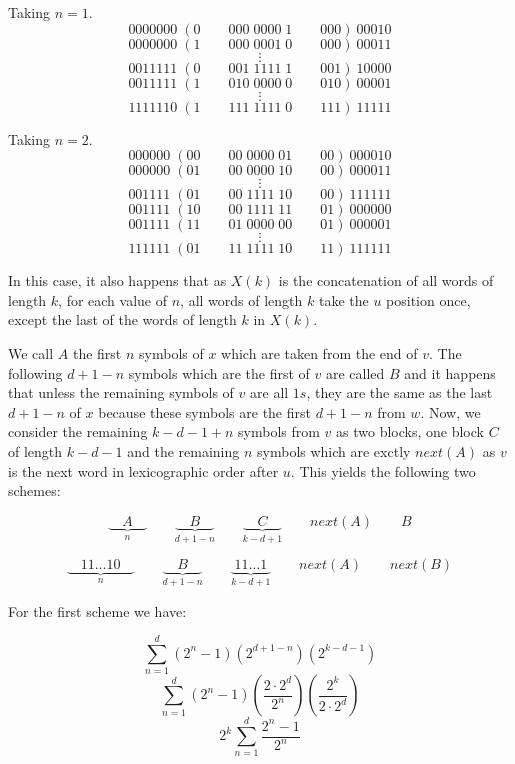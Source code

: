 \documentclass[11pt,a4paper]{tesis}
\begin{document}
Taking $n = 1$.
$$0000000\; (0 \qquad 000 \; 0000 \; 1 \qquad 000) \: 00010$$
$$0000000\; (1 \qquad 000 \; 0001 \; 0 \qquad 000) \: 00011$$
$$\vdots$$
$$0011111\; (0 \qquad 001 \; 1111 \; 1 \qquad 001) \: 10000$$
$$0011111\; (1 \qquad 010 \; 0000 \; 0 \qquad 010) \: 00001$$
$$\vdots$$
$$1111110\; (1 \qquad 111 \; 1111 \; 0 \qquad 111) \: 11111$$

Taking $n = 2$.
$$000000\; (00 \qquad 00 \; 0000 \; 01 \qquad 00) \: 000010$$
$$000000\; (01 \qquad 00 \; 0000 \; 10 \qquad 00) \: 000011$$
$$\vdots$$
$$001111\; (01 \qquad 00 \; 1111 \; 10 \qquad 00) \: 111111$$
$$001111\; (10 \qquad 00 \; 1111 \; 11 \qquad 01) \: 000000$$
$$001111\; (11 \qquad 01 \; 0000 \; 00 \qquad 01) \: 000001$$
$$\vdots$$
$$111111\; (01 \qquad 11 \; 1111 \; 10 \qquad 11) \: 111111$$

In this case, it also happens that as $X(k)$ is the concatenation of all words of length $k$, for each value of $n$, 
all words of length $k$ take the $u$ position once, except the last of the words of length $k$ in $X(k)$.

We call $A$ the first $n$ symbols of $x$ which are taken from the end of $v$. The following $d + 1 - n$ symbols which are the first of $v$ are called $B$ and it happens that unless the remaining symbols of $v$ are all $1s$, 
they are the same as the last $d + 1 - n$ of $x$ because these symbols are the first $d + 1 - n$ from $w$.
Now, we consider the remaining $k - d - 1 + n$ symbols from $v$ as two blocks, one block $C$ of length $k - d - 1$ and the remaining $n$ symbols which are exctly $next(A)$ as $v$ is the next word in lexicographic order after $u$.
This yields the following two schemes:

$$\underbrace{\quad A \quad }_{n} \qquad \underbrace{\quad B \quad }_{d + 1 - n}  \qquad \underbrace{\quad C \quad }_{k-d+1} \qquad next(A) \qquad B$$

$$\underbrace{\quad 11\dots10 \quad }_{n} \qquad \underbrace{\quad B \quad }_{d + 1 - n}  \qquad \underbrace{\; 11\dots1 \; }_{k-d+1} \qquad next(A) \qquad next(B)$$

For the first scheme we have:

$$\sum_{n=1}^{d}(2^n - 1) (2^{d + 1 - n}) (2^{k - d - 1})$$
$$\sum_{n=1}^{d}(2^n - 1) (\frac{2 \cdot 2^d}{2^n})     (\frac{2^k}{2 \cdot 2^d})$$
$$ 2^k \sum_{n=1}^{d} \frac{2^n - 1}{2^n} $$

\end{document}
